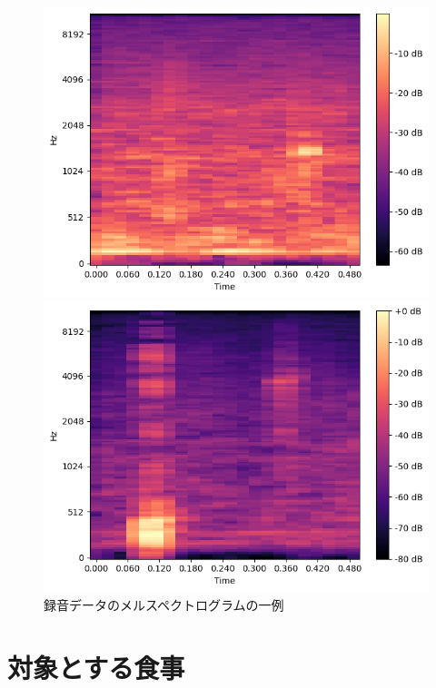 \begin{figure}[t]
\begin{minipage}[b]{0.16\hsize}
        \includegraphics[width=\hsize]{img/melspec/jelly.png}
    \end{minipage}
    \begin{minipage}[b]{0.16\hsize}
        \centering
        \includegraphics[width=\hsize]{img/melspec/grilled-fish.png}
    \end{minipage}
    \caption{録音データのメルスペクトログラムの一例}
    \label{fig:sample-melspec-data}
\end{figure}

\section{対象とする食事}

